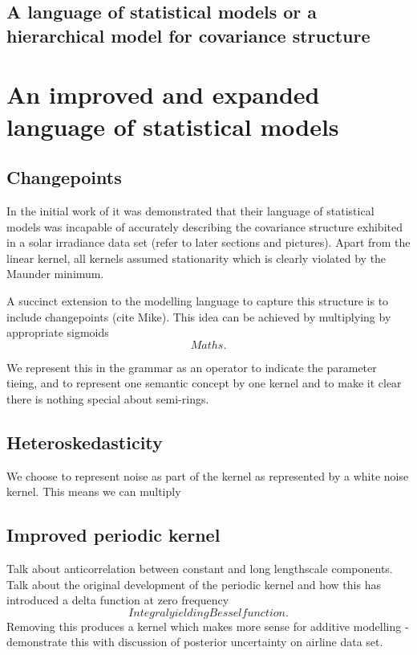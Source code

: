 \documentclass[twoside]{article}
\begin{document}

\subsection{A language of statistical models or a hierarchical model for covariance structure}

\section{An improved and expanded language of statistical models}
\label{sec:improvements}

\subsection{Changepoints}

In the initial work of \cite{DuvLloGroetal13} it was demonstrated that their language of statistical models was incapable of accurately describing the covariance structure exhibited in a solar irradiance data set (refer to later sections and pictures).
Apart from the linear kernel, all kernels assumed stationarity which is clearly violated by the Maunder minimum.

A succinct extension to the modelling language to capture this structure is to include changepoints (cite Mike).
This idea can be achieved by multiplying by appropriate sigmoids
\[
Maths.
\]

We represent this in the grammar as an operator to indicate the parameter tieing, and to represent one semantic concept by one kernel and to make it clear there is nothing special about semi-rings.

\subsection{Heteroskedasticity}

We choose to represent noise as part of the kernel as represented by a white noise kernel.
This means we can multiply 

\subsection{Improved periodic kernel}

Talk about anticorrelation between constant and long lengthscale components.
Talk about the original development of the periodic kernel and how this has introduced a delta function at zero frequency
\[
Integral yielding Bessel function.
\]
Removing this produces a kernel which makes more sense for additive modelling - demonstrate this with discussion of posterior uncertainty on airline data set.
\end{document}
